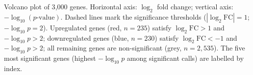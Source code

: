 \caption{Volcano plot of 3{,}000 genes. Horizontal axis: $\log_2$ fold change; vertical axis: $-\log_{10}(p\text{-value})$. Dashed lines mark the significance thresholds ($|\log_2\text{FC}|=1$; $-\log_{10}p=2$). Upregulated genes (red, $n=235$) satisfy $\log_2\text{FC}>1$ and $-\log_{10}p>2$; downregulated genes (blue, $n=230$) satisfy $\log_2\text{FC}<-1$ and $-\log_{10}p>2$; all remaining genes are non-significant (grey, $n=2{,}535$). The five most significant genes (highest $-\log_{10}p$ among significant calls) are labelled by index.}
